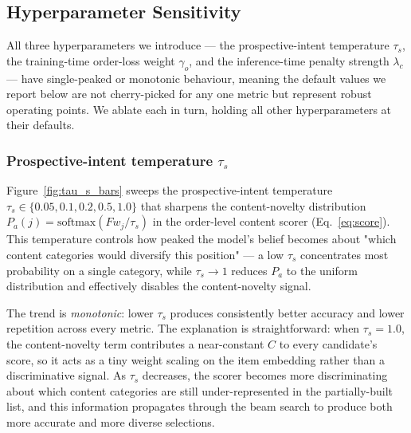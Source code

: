 %
%


\subsection{Hyperparameter Sensitivity}
\label{sec:hyperparam}

All three hyperparameters we introduce — the prospective-intent temperature
$\tau_s$, the training-time order-loss weight $\gamma_o$, and the
inference-time penalty strength $\lambda_c$ — have single-peaked or
monotonic behaviour, meaning the default values we report below are not
cherry-picked for any one metric but represent robust operating points. We
ablate each in turn, holding all other hyperparameters at their defaults.


\subsubsection{Prospective-intent temperature $\tau_s$}
\label{sec:hyperparam_tau}

Figure~\ref{fig:tau_s_bars} sweeps the prospective-intent temperature
$\tau_s\in\{0.05, 0.1, 0.2, 0.5, 1.0\}$ that sharpens the content-novelty
distribution $P_a(j)=\mathrm{softmax}(Fw_j/\tau_s)$ in the order-level
content scorer (Eq.~\eqref{eq:score}). This temperature controls how
peaked the model's belief becomes about "which content categories would
diversify this position" — a low $\tau_s$ concentrates most probability on
a single category, while $\tau_s\rightarrow 1$ reduces $P_a$ to the uniform
distribution and effectively disables the content-novelty signal.

The trend is \emph{monotonic}: lower $\tau_s$ produces consistently better
accuracy and lower repetition across every metric. The explanation is
straightforward: when $\tau_s=1.0$, the content-novelty term contributes a
near-constant $C$ to every candidate's score, so it acts as a tiny weight
scaling on the item embedding rather than a discriminative signal. As
$\tau_s$ decreases, the scorer becomes more discriminating about which
content categories are still under-represented in the partially-built list,
and this information propagates through the beam search to produce both more
accurate and more diverse selections.

